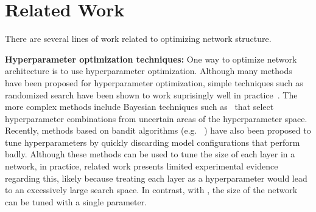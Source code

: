 \section{Related Work}


There are several lines of work related to optimizing network structure. 


\noindent\textbf{Hyperparameter optimization techniques: }
One way to optimize network architecture is to use 
hyperparameter optimization. Although many methods have been 
proposed for hyperparameter optimization, simple techniques such as randomized
search have been shown to work suprisingly well in practice~\cite{BergstraJAMESBERGSTRA2012,Snoek12}.
The more complex methods include Bayesian techniques such as~\cite{Snoek12} that
select hyperparameter combinations from uncertain areas of the
hyperparameter space. 
Recently, methods based on bandit algorithms (e.g.
~\cite{li2016hyperband, jamieson2016}) have also been proposed to tune
hyperparameters by quickly discarding 
model configurations that perform badly. 
Although these methods can be used to tune the size of each layer in a network, 
in practice, related work presents limited experimental evidence
regarding this, likely because treating each layer as a hyperparameter
would lead to an excessively large search space.
In contrast, with \shrink, the size of the network can be tuned with 
a single parameter.

